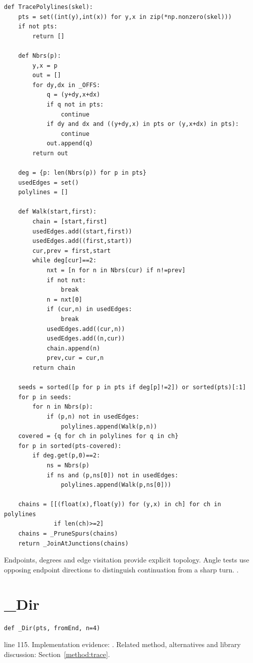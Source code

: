 \begin{lstlisting}[style=plain]
def TracePolylines(skel):
    pts = set((int(y),int(x)) for y,x in zip(*np.nonzero(skel)))
    if not pts:
        return []

    def Nbrs(p):
        y,x = p
        out = []
        for dy,dx in _OFFS:
            q = (y+dy,x+dx)
            if q not in pts:
                continue
            if dy and dx and ((y+dy,x) in pts or (y,x+dx) in pts):
                continue
            out.append(q)
        return out

    deg = {p: len(Nbrs(p)) for p in pts}
    usedEdges = set()
    polylines = []

    def Walk(start,first):
        chain = [start,first]
        usedEdges.add((start,first))
        usedEdges.add((first,start))
        cur,prev = first,start
        while deg[cur]==2:
            nxt = [n for n in Nbrs(cur) if n!=prev]
            if not nxt:
                break
            n = nxt[0]
            if (cur,n) in usedEdges:
                break
            usedEdges.add((cur,n))
            usedEdges.add((n,cur))
            chain.append(n)
            prev,cur = cur,n
        return chain

    seeds = sorted([p for p in pts if deg[p]!=2]) or sorted(pts)[:1]
    for p in seeds:
        for n in Nbrs(p):
            if (p,n) not in usedEdges:
                polylines.append(Walk(p,n))
    covered = {q for ch in polylines for q in ch}
    for p in sorted(pts-covered):
        if deg.get(p,0)==2:
            ns = Nbrs(p)
            if ns and (p,ns[0]) not in usedEdges:
                polylines.append(Walk(p,ns[0]))

    chains = [[(float(x),float(y)) for (y,x) in ch] for ch in polylines
              if len(ch)>=2]
    chains = _PruneSpurs(chains)
    return _JoinAtJunctions(chains)
\end{lstlisting}
Endpoints, degrees and edge visitation provide explicit topology. Angle tests use opposing endpoint directions to distinguish continuation from a sharp turn. \cite{zhangsuen1984,code2026}.


\section{\_Dir}\label{fn:style:-Dir}
\begin{lstlisting}[style=sig]
def _Dir(pts, fromEnd, n=4)
\end{lstlisting}
 line 115. Implementation evidence: \cite{code2026}. Related method, alternatives and library discussion: Section~\ref{method:trace}.


